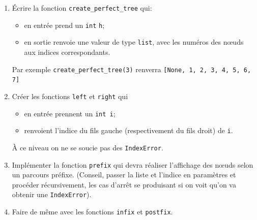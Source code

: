 \documentclass[a4paper,12pt,article,firamath]{nsi}
\begin{document}
    \begin{enumerate}
        \item \'Ecrire la fonction \texttt{create\_perfect\_tree} qui:
        \begin{itemize}
            \item en entrée prend un \texttt{int} \texttt{h};
            \item en sortie renvoie une valeur de type \texttt{list}, avec les numéros des n\oe uds aux indices correspondants.
        \end{itemize}
        Par exemple \texttt{create_perfect_tree(3)} renverra \texttt{[None, 1, 2, 3, 4, 5, 6, 7]}
        \item Créer les fonctions \texttt{left} et \texttt{right} qui
        \begin{itemize}
            \item en entrée prennent un \texttt{int i};
            \item renvoient l'indice du fils gauche (respectivement du fils droit) de \texttt{i}.
        \end{itemize}
        À ce niveau on ne se soucie pas des \texttt{IndexError}.
        \item Implémenter la fonction \texttt{prefix} qui devra réaliser l'affichage des n\oe uds selon un parcours préfixe. (Conseil, passer la liste et l'indice en paramètres et procéder récursivement, les cas d'arrêt se produisant si on voit qu'on va obtenir une \texttt{IndexError}).
        \item Faire de même avec les fonctions \texttt{infix} et \texttt{postfix}.
    \end{enumerate}
\end{document}
